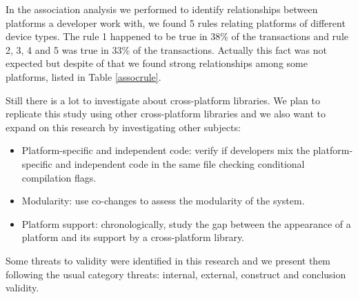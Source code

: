 \documentclass[10pt, conference]{IEEEtran}
\begin{document}
In the association analysis we performed to identify relationships between platforms a developer work with, we found 5 rules relating platforms of different device types. The rule 1 happened to be true in 38\% of the transactions and rule 2, 3, 4 and 5 was true in 33\% of the transactions.  Actually this fact was not expected but despite of that we found strong relationships among some platforms, listed in Table \ref{assocrule}. 

Still there is a lot to investigate about cross-platform libraries. We plan to replicate this study using other cross-platform libraries and we also want to expand on this research by investigating other subjects:
\begin{itemize}
 
\item Platform-specific and independent code: verify if developers mix the platform-specific and independent code in the same file checking conditional compilation flags.

\item Modularity: use co-changes to assess the modularity of the system. 

\item Platform support: chronologically, study the gap between the appearance of a platform and its support by a cross-platform library.

\end{itemize}


Some threats to validity were identified in this research and we present them  following the usual category threats: internal, external, construct and conclusion validity.
\end{document}
